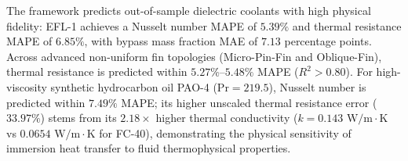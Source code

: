 The framework predicts out-of-sample dielectric coolants with high physical fidelity: EFL-1 achieves a Nusselt number MAPE of $\mathbf{5.39\%}$ and thermal resistance MAPE of $\mathbf{6.85\%}$, with bypass mass fraction MAE of $\mathbf{7.13}$ percentage points. Across advanced non-uniform fin topologies (Micro-Pin-Fin and Oblique-Fin), thermal resistance is predicted within $\mathbf{5.27\%\text{--}5.48\%}$ MAPE ($R^2 > 0.80$). For high-viscosity synthetic hydrocarbon oil PAO-4 ($\mathrm{Pr}=219.5$), Nusselt number is predicted within $\mathbf{7.49\%}$ MAPE; its higher unscaled thermal resistance error ($33.97\%$) stems from its $2.18\times$ higher thermal conductivity ($k = 0.143\text{ W/m}\cdot\text{K}$ vs $0.0654\text{ W/m}\cdot\text{K}$ for FC-40), demonstrating the physical sensitivity of immersion heat transfer to fluid thermophysical properties.

